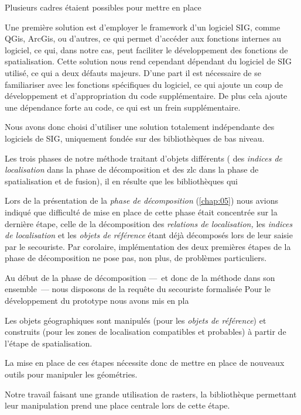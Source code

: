 Plusieurs cadres étaient possibles pour mettre en place

Une première solution est d'employer le framework d'un logiciel SIG,
comme QGis, ArcGis, ou d'autres, ce qui permet d’accéder aux fonctions
internes au logiciel, ce qui, dans notre cas, peut faciliter le
développement des fonctions de spatialisation. Cette solution nous
rend cependant dépendant du logiciel de SIG utilisé, ce qui a deux
défauts majeurs. D'une part il est nécessaire de se familiariser avec
les fonctions spécifiques du logiciel, ce qui ajoute un coup de
développement et d'appropriation du code supplémentaire. De plus cela
ajoute une dépendance forte au code, ce qui est un frein
supplémentaire.

Nous avons donc choisi d'utiliser une solution totalement indépendante
des logiciels de SIG, uniquement fondée sur des bibliothèques de bas
niveau.


Les trois phases de notre méthode traitant d'objets différents (\ie
des \emph{indices de localisation} dans la phase de décomposition et
des \ac{zlc} dans la phase de spatialisation et de fusion), il en
résulte que les bibliothèques qui 


Lors de la présentation de la \emph{phase de décomposition}
(\autoref{chap:05}) nous avions indiqué que difficulté de mise en
place de cette phase était concentrée sur la dernière étape, celle de
la décomposition des \emph{relations de localisation,} les
\emph{indices de localisation} et les \emph{objets de référence} étant
déjà décomposés lors de leur saisie par le secouriste. Par corolaire,
implémentation des deux premières étapes de la phase de décomposition
ne pose pas, non plus, de problèmes particuliers.

Au début de la phase de décomposition ---~et donc de la méthode dans
son ensemble~--- nous disposons de la requête du secouriste
formalisée
%
Pour le développement du prototype nous avons mis en pla



Les objets géographiques sont manipulés (pour les \emph{objets de
  référence}) et construits (pour les zones de localisation
compatibles et probables) à partir de l'étape de spatialisation.

La mise en place de ces étapes nécessite donc de mettre en place de
nouveaux outils pour manipuler les géométries.

Notre travail faisant une grande utilisation de rasters, la
bibliothèque permettant leur manipulation prend une place centrale
lors de cette étape.

